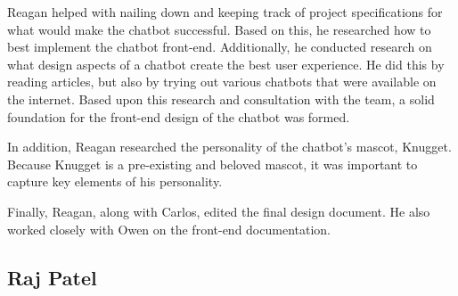 \documentclass[titlepage, 12pt]{article}
\begin{document}
Reagan helped with nailing down and keeping track of project specifications for what would make the chatbot successful. Based on this, he researched how to best implement the chatbot front-end. Additionally, he conducted research on what design aspects of a chatbot create the best user experience. He did this by reading articles, but also by trying out various chatbots that were available on the internet. Based upon this research and consultation with the team, a solid foundation for the front-end design of the chatbot was formed. 

In addition, Reagan researched the personality of the chatbot’s mascot, Knugget. Because Knugget is a pre-existing and beloved mascot, it was important to capture key elements of his personality.

Finally, Reagan, along with Carlos, edited the final design document. He also worked closely with Owen on the front-end documentation.

\subsection{Raj Patel}
\end{document}
